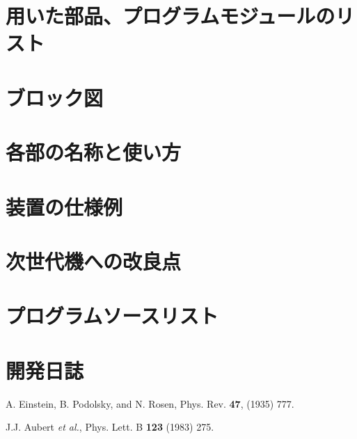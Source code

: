 \documentclass[uplatex,dvipdfmx,a4j,12pt]{jsarticle}
\begin{document}
\section{用いた部品、プログラムモジュールのリスト}

\section{ブロック図}

\section{各部の名称と使い方}

\section{装置の仕様例}

\section{次世代機への改良点}

\appendix

\section{プログラムソースリスト}

\section{開発日誌}

\begin{thebibliography}{9}

        A. Einstein, B. Podolsky, and N. Rosen, 
        Phys. Rev. \textbf{47}, (1935) 777.

        J.J. Aubert \textit{et al.},
        Phys. Lett. B \textbf{123} (1983) 275.
    
\end{thebibliography}
\end{document}
